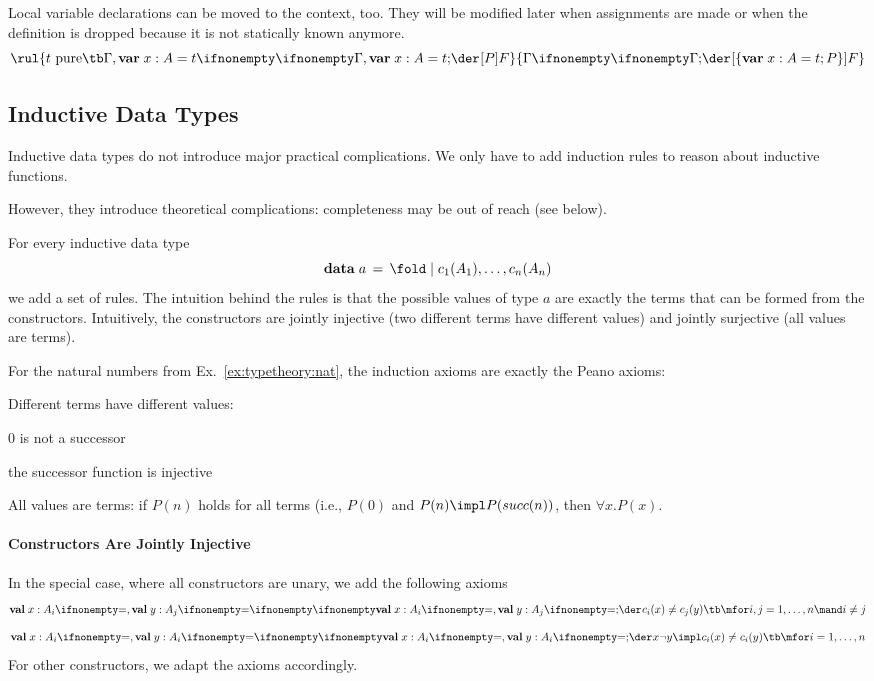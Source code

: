 Local variable declarations can be moved to the context, too. They will be modified later when assignments are made or when the definition is dropped because it is not statically known anymore.
\[\rul{t\text{ pure}\tb\iscons{}{\Gamma,\amval{x}{A}{t}}{}{\abox{P}{F}}}
      {\iscons{}{\Gamma}{}{\abox{\{\amval{x}{A}{t}; P\}}{F}}}
\]


\subsection{Inductive Data Types}

Inductive data types do not introduce major practical complications.
We only have to add induction rules to reason about inductive functions.

However, they introduce theoretical complications: completeness may be out of reach (see below).

For every inductive data type
\[\adata{a}{c_1(A_1),\ldots,c_n(A_n)}\]
we add a set of rules.
The intuition behind the rules is that the possible values of type $a$ are exactly the terms that can be formed from the constructors.
Intuitively, the constructors are jointly injective (two different terms have different values) and jointly surjective (all values are terms).

\begin{example}\label{ex:typetheory:nat2}
For the natural numbers from Ex.~\ref{ex:typetheory:nat}, the induction axioms are exactly the Peano axioms:
\begin{compactitem}
 \item Different terms have different values:
   \begin{compactitem}
    \item $0$ is not a successor
    \item the successor function is injective
   \end{compactitem}
 \item All values are terms: if $P(n)$ holds for all terms (i.e., $P(0)$ and $P(n)\impl P(succ(n))$, then $\forall x.P(x)$.
\end{compactitem}
\end{example}

\paragraph{Constructors Are Jointly Injective}
In the special case, where all constructors are unary, we add the following axioms
 \[\iscons{}{\aval{x}{A_i}{},\aval{y}{A_j}{}}{}{c_i(x)\neq c_j(y)} \tb\mfor i,j= 1,\ldots,n\mand i\neq j\]
 \[\iscons{}{\aval{x}{A_i}{},\aval{y}{A_i}{}}{}{x\neg y\impl c_i(x)\neq c_i(y)} \tb \mfor i=1,\ldots,n\] 
For other constructors, we adapt the axioms accordingly.

